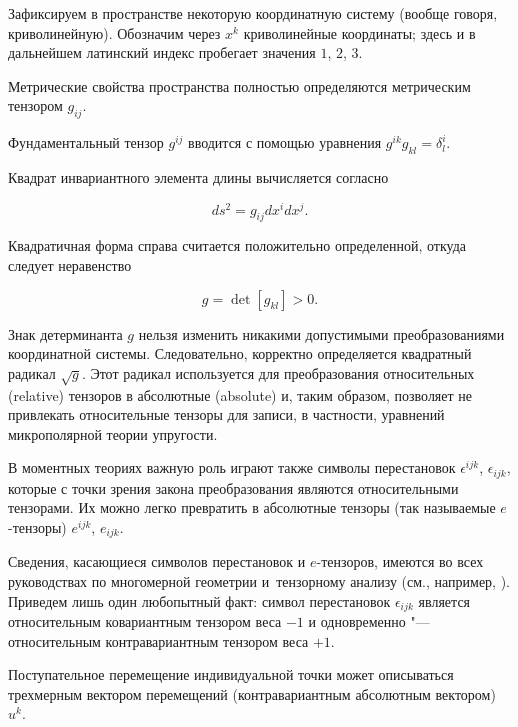 Зафиксируем в пространстве некоторую координатную систему (вообще говоря, криволинейную). Обозначим через \(x^k\) криволинейные координаты; здесь и в дальнейшем латинский индекс пробегает значения $1$, $2$, $3$. 

Метрические свойства пространства полностью определяются метрическим тензором \(g_{ij}\). 

Фундаментальный тензор \(g^{ij}\) вводится с помощью уравнения \(g^{ik}g_{kl}=\delta^i_l\). 

Квадрат инвариантного элемента длины вычисляется согласно 

\begin{equation}

ds^2=g_{ij}dx^idx^j.

\end{equation}

Квадратичная форма справа считается положительно определенной, откуда следует неравенство

\begin{equation}

g=\det[g_{kl}]>0.

\end{equation}

Знак детерминанта \(g\) нельзя изменить никакими допустимыми преобразованиями координатной системы. Следовательно, корректно определяется квадратный радикал \(\sqrt{g}\). Этот радикал используется для преобразования относительных (relative) тензоров в абсолютные (absolute) и, таким образом, позволяет не привлекать относительные тензоры для записи, в частности, уравнений микрополярной теории упругости.



В моментных теориях важную роль играют также символы перестановок \(\epsilon^{ijk}\), \(\epsilon_{ijk}\), которые с точки зрения закона преобразования являются относительными тензорами. Их можно легко превратить в абсолютные тензоры (так называемые \(e\)-тензоры) \(e^{ijk}\), \(e_{ijk}\). 

Сведения, касающиеся символов перестановок и \(e\)-тензоров, имеются во всех руководствах по многомерной геометрии и~тензорному анализу (см., например, \cite{Rosenfeld-1966, Rashevskii-1967, Sokolnikoff-1971}). Приведем лишь один любопытный факт: символ перестановок \(\epsilon_{ijk}\) является относительным ковариантным тензором веса \(-1\) и одновременно "--- относительным контравариантным тензором веса \(+1\).



Поступательное перемещение индивидуальной точки может описываться трехмерным вектором перемещений (контравариантным абсолютным вектором) \(u^k\). 

